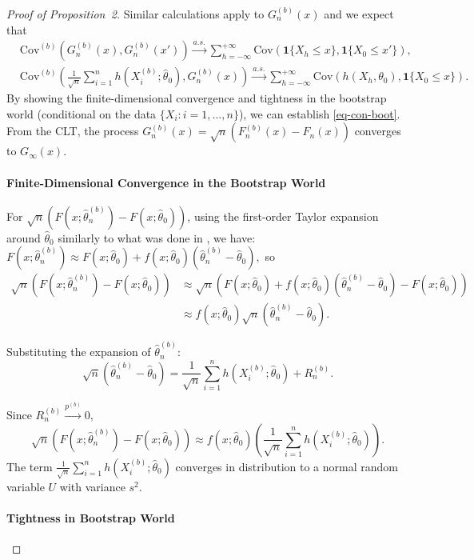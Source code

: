 \documentclass[12pt]{article}
\begin{document}
\begin{proof}[Proof of Proposition~2]
Similar calculations apply 
to $G_n^{(b)}(x)$ and we expect that
\begin{align*}
&\text{Cov}^{(b)}(G_n^{(b)}(x),G_n^{(b)}(x'))\overset{a.s.}{\rightarrow}   
\sum^{+\infty}_{h=-\infty}
\text{Cov}(\mathbf{1}\{X_{h}\leq x\},\mathbf{1}\{X_0\leq x'\}),\\
&\text{Cov}^{(b)}\left(\frac{1}{\sqrt{n}}\sum^{n}_{i=1}h(X_i^{(b)};
\hat{\theta}_0), G_n^{(b)}(x)\right)\overset{a.s.}{\rightarrow} 
\sum^{+\infty}_{h=-\infty}\text{Cov}(h(X_{h},\theta_0),\mathbf{1}\{X_0\leq x\}).
\end{align*}
By showing the finite-dimensional convergence and tightness in the bootstrap 
world (conditional on the data $\{X_i: i = 1, \ldots, n\}$), we can establish 
\eqref{eq-con-boot}.
From the CLT, the process $G_n^{(b)}(x) = \sqrt{n}(F_n^{(b)}(x) - F_n(x))$ 
converges  to $G_{\infty}(x)$.

\paragraph{Finite-Dimensional Convergence in the Bootstrap World}

For $\sqrt{n}(F(x;\hat{\theta}_n^{(b)}) - F(x;\hat{\theta}_0))$, using the 
first-order Taylor 
expansion around $\hat{\theta}_0$ similarly to what was done in 
\citet{kunsch1989jackknife}, we have:
$
F(x;\hat{\theta}_n^{(b)}) \approx F(x;\hat{\theta}_0) + f(x; 
\hat{\theta}_0) (\hat{\theta}_n^{(b)} - \hat{\theta}_0),
$ so
\begin{align*}
  \sqrt{n}(F(x;\hat{\theta}_n^{(b)}) - F(x;\hat{\theta}_0))
  &\approx \sqrt{n} (F(x;\hat{\theta}_0) +
  f(x; \hat{\theta}_0) (\hat{\theta}_n^{(b)} - \hat{\theta}_0) - F(x;\hat{\theta}_0)) \\
  &\approx  f(x; \hat{\theta}_0) \sqrt{n} (\hat{\theta}_n^{(b)} - \hat{\theta}_0).
\end{align*}


Substituting the expansion of $\hat{\theta}_n^{(b)}$:
\[
\sqrt{n} (\hat{\theta}_n^{(b)} - \hat{\theta}_0) = \frac{1}{\sqrt{n}} 
\sum_{i=1}^{n} 
h(X_i^{(b)}; \hat{\theta}_0) + R_n^{(b)}.
\]

Since $R_n^{(b)} \overset{p^{(b)}}{\rightarrow} 0$, 
\[
\sqrt{n}(F(x;\hat{\theta}_n^{(b)}) - F(x;\hat{\theta}_0)) \approx 
f(x; \hat{\theta}_0) \left( \frac{1}{\sqrt{n}} \sum_{i=1}^{n} h(X_i^{(b)}; 
\hat{\theta}_0) \right).
\]
The term $\frac{1}{\sqrt{n}} \sum_{i=1}^{n} h(X_i^{(b)}; \hat{\theta}_0)$ 
converges in distribution to a normal random variable $U$ with variance 
$s^2$.


\paragraph{Tightness in Bootstrap World}


\end{proof}

 

\end{document}
